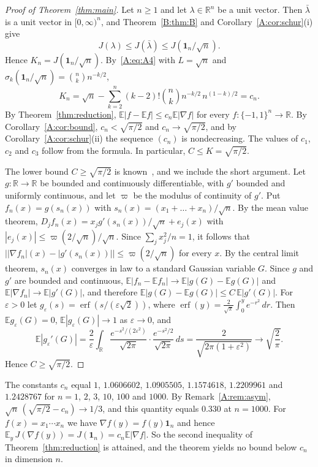 \documentclass[11pt]{amsart}
\theoremstyle{remark}
\numberwithin{equation}{section}
\newcommand{\R}{\mathbb{R}}
\newcommand{\E}{\mathbb{E}}
\newcommand{\eps}{\varepsilon}
\begin{document}
\begin{proof}[Proof of Theorem~\ref{thm:main}]
Let $n\ge1$ and let $\lambda\in\R^n$ be a unit vector. Then $\bar\lambda$ is a unit vector in $[0,\infty)^n$, and Theorem~\ref{B:thm:B} and Corollary~\ref{A:cor:schur}(i) give
\[
J(\lambda)\le J(\bar\lambda)\le J(\mathbf 1_n/\sqrt n).
\]
Hence $K_n=J(\mathbf 1_n/\sqrt n)$. By~\eqref{A:eq:A4} with $L=\sqrt n$ and $\sigma_k(\mathbf 1_n/\sqrt n)=\binom nk n^{-k/2}$,
\[
K_n=\sqrt n-\sum_{k=2}^n(k-2)!\binom nk n^{-k/2}\,n^{(1-k)/2}=c_n.
\]
By Theorem~\ref{thm:reduction}, $\E|f-\E f|\le c_n\E|\nabla f|$ for every $f\colon\{-1,1\}^n\to\R$. By Corollary~\ref{A:cor:bound}, $c_n<\sqrt{\pi/2}$ and $c_n\to\sqrt{\pi/2}$, and by Corollary~\ref{A:cor:schur}(ii) the sequence $(c_n)$ is nondecreasing. The values of $c_1$, $c_2$ and $c_3$ follow from the formula. In particular, $C\le K=\sqrt{\pi/2}$.

The lower bound $C\ge\sqrt{\pi/2}$ is known~\cite{ILvHV}, and we include the short argument. Let $g\colon\R\to\R$ be bounded and continuously differentiable, with $g'$ bounded and uniformly continuous, and let $\varpi$ be the modulus of continuity of $g'$. Put $f_n(x)=g(s_n(x))$ with $s_n(x)=(x_1+\dots+x_n)/\sqrt n$. By the mean value theorem, $D_jf_n(x)=x_jg'(s_n(x))/\sqrt n+e_j(x)$ with $|e_j(x)|\le\varpi(2/\sqrt n)/\sqrt n$. Since $\sum_jx_j^2/n=1$, it follows that $\bigl||\nabla f_n|(x)-|g'(s_n(x))|\bigr|\le\varpi(2/\sqrt n)$ for every $x$. By the central limit theorem, $s_n(x)$ converges in law to a standard Gaussian variable $G$. Since $g$ and $g'$ are bounded and continuous, $\E|f_n-\E f_n|\to\E|g(G)-\E g(G)|$ and $\E|\nabla f_n|\to\E|g'(G)|$, and therefore $\E|g(G)-\E g(G)|\le C\,\E|g'(G)|$. For $\eps>0$ let $g_\eps(s)=\operatorname{erf}(s/(\eps\sqrt2))$, where $\operatorname{erf}(y)=\frac2{\sqrt\pi}\int_0^ye^{-r^2}\,dr$. Then $\E g_\eps(G)=0$, $\E|g_\eps(G)|\to1$ as $\eps\to0$, and
\[
\E|g_\eps'(G)|=\frac2\eps\int_\R\frac{e^{-s^2/(2\eps^2)}}{\sqrt{2\pi}}\cdot\frac{e^{-s^2/2}}{\sqrt{2\pi}}\,ds=\frac2{\sqrt{2\pi(1+\eps^2)}}\to\sqrt{\frac2\pi}.
\]
Hence $C\ge\sqrt{\pi/2}$.
\end{proof}

The constants $c_n$ equal $1$, $1.0606602$, $1.0905505$, $1.1574618$, $1.2209961$ and $1.2428767$ for $n=1$, $2$, $3$, $10$, $100$ and $1000$. By Remark~\ref{A:rem:asym}, $\sqrt n\,(\sqrt{\pi/2}-c_n)\to1/3$, and this quantity equals $0.330$ at $n=1000$. For $f(x)=x_1\cdots x_n$ we have $\nabla f(y)=f(y)\mathbf 1_n$ and hence $\E_y\,J(\nabla f(y))=J(\mathbf 1_n)=c_n\E|\nabla f|$. So the second inequality of Theorem~\ref{thm:reduction} is attained, and the theorem yields no bound below $c_n$ in dimension $n$.
\end{document}

